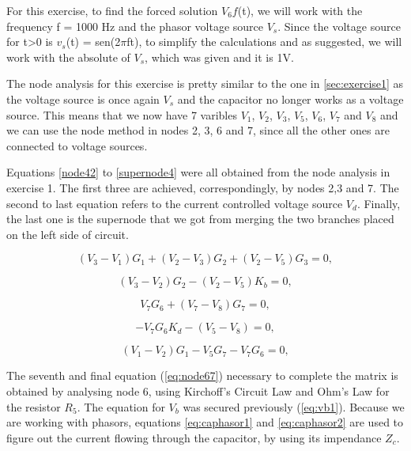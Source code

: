 For this exercise, to find the forced solution $V_6f$(t), we will work with the frequency f = 1000 Hz and the phasor voltage source $V_s$. Since the voltage source for t>0 is $v_s$(t) = sen(2$\pi$ft), to simplify the calculations and as suggested, we will work with the absolute of $V_s$, which was given and it is 1V. 

The node analysis for this exercise is pretty similar to the one in \ref{sec:exercise1} as the voltage source is once again $V_s$ and the capacitor no longer works as a voltage source. This means that we now have 7 varibles $V_1$, $V_2$, $V_3$, $V_5$, $V_6$, $V_7$ and $V_8$ and we can use the node method in nodes 2, 3, 6 and 7, since all the other ones are connected to voltage sources.

Equations \ref{node42} to \ref{supernode4} were all obtained from the node analysis in exercise 1. The first three are achieved, correspondingly, by nodes 2,3 and 7. The second to last equation refers to the current controlled voltage source $V_d$. Finally, the last one is the supernode that we got from merging the two branches placed on the left side of circuit.

\begin{equation}
  (V_{3} - V_{1})G_{1} + (V_{2} - V_{3})G_{2} + (V_{2} - V_{5})G_{3}= 0,
  \label{eq:node42}
\end{equation}

\begin{equation}
  (V_{3} - V_{2})G_{2} - (V_{2} - V_{5})K_{b} = 0,
  \label{eq:node43}
\end{equation}


\begin{equation}
  V_{7}G_{6} + (V_{7} - V_{8})G_{7} = 0,
  \label{eq:node47}
\end{equation}


\begin{equation}
  -V_{7}G_{6}K_{d} - (V_{5} - V_{8}) = 0,
  \label{eq:vd4}
\end{equation}

\begin{equation}
  (V_{1} - V_{2})G_{1} - V_{5}G_{7} - V_{7}G_{6} = 0,
  \label{eq:supernode4}
\end{equation}

The seventh and final equation (\ref{eq:node67}) necessary to complete the matrix is obtained by analysing node 6, using Kirchoff's Circuit Law and Ohm's Law for the resistor $R_5$. The equation for $V_b$ was secured previously (\ref{eq:vb1}). Because we are working with phasors, equations \ref{eq:caphasor1} and \ref{eq:caphasor2} are used to figure out the current flowing through the capacitor, by using its impendance $Z_c$.

